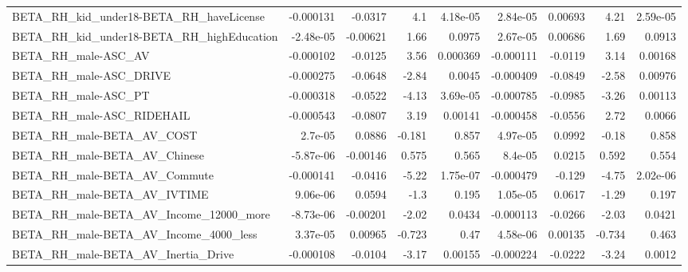 \begin{tabular}{lrrrrrrrr}
BETA\_RH\_kid\_under18-BETA\_RH\_haveLicense            &   -0.000131 &      -0.0317 &      4.1 & 4.18e-05 &   2.84e-05 &     0.00693 &         4.21 &      2.59e-05 \\
BETA\_RH\_kid\_under18-BETA\_RH\_highEducation          &   -2.48e-05 &     -0.00621 &     1.66 &   0.0975 &   2.67e-05 &     0.00686 &         1.69 &        0.0913 \\
BETA\_RH\_male-ASC\_AV                                &   -0.000102 &      -0.0125 &     3.56 & 0.000369 &  -0.000111 &     -0.0119 &         3.14 &       0.00168 \\
BETA\_RH\_male-ASC\_DRIVE                             &   -0.000275 &      -0.0648 &    -2.84 &   0.0045 &  -0.000409 &     -0.0849 &        -2.58 &       0.00976 \\
BETA\_RH\_male-ASC\_PT                                &   -0.000318 &      -0.0522 &    -4.13 & 3.69e-05 &  -0.000785 &     -0.0985 &        -3.26 &       0.00113 \\
BETA\_RH\_male-ASC\_RIDEHAIL                          &   -0.000543 &      -0.0807 &     3.19 &  0.00141 &  -0.000458 &     -0.0556 &         2.72 &        0.0066 \\
BETA\_RH\_male-BETA\_AV\_COST                          &     2.7e-05 &       0.0886 &   -0.181 &    0.857 &   4.97e-05 &      0.0992 &        -0.18 &         0.858 \\
BETA\_RH\_male-BETA\_AV\_Chinese                       &   -5.87e-06 &     -0.00146 &    0.575 &    0.565 &    8.4e-05 &      0.0215 &        0.592 &         0.554 \\
BETA\_RH\_male-BETA\_AV\_Commute                       &   -0.000141 &      -0.0416 &    -5.22 & 1.75e-07 &  -0.000479 &      -0.129 &        -4.75 &      2.02e-06 \\
BETA\_RH\_male-BETA\_AV\_IVTIME                        &    9.06e-06 &       0.0594 &     -1.3 &    0.195 &   1.05e-05 &      0.0617 &        -1.29 &         0.197 \\
BETA\_RH\_male-BETA\_AV\_Income\_12000\_more             &   -8.73e-06 &     -0.00201 &    -2.02 &   0.0434 &  -0.000113 &     -0.0266 &        -2.03 &        0.0421 \\
BETA\_RH\_male-BETA\_AV\_Income\_4000\_less              &    3.37e-05 &      0.00965 &   -0.723 &     0.47 &   4.58e-06 &     0.00135 &       -0.734 &         0.463 \\
BETA\_RH\_male-BETA\_AV\_Inertia\_Drive                 &   -0.000108 &      -0.0104 &    -3.17 &  0.00155 &  -0.000224 &     -0.0222 &        -3.24 &        0.0012 \\

\end{tabular}
